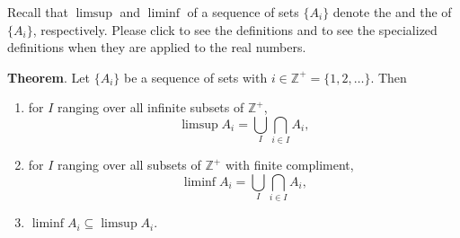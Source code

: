 \documentclass[12pt]{article}
\begin{document}
Recall that $\limsup$ and $\liminf$ of a sequence of sets $\lbrace A_i \rbrace$ denote the  and the  of $\lbrace A_i \rbrace$, respectively.  Please click  to see the definitions and  to see the specialized definitions when they are applied to the real numbers.

\textbf{Theorem}.  Let $\lbrace A_i \rbrace$ be a sequence of sets with $i\in\mathbb{Z}^{+}=\lbrace 1,2,\ldots \rbrace$.  Then
\begin{enumerate}
\item for $I$ ranging over all infinite subsets of $\mathbb{Z}^{+}$, $$\limsup A_i=\bigcup_{I}\bigcap_{i\in I}A_i,$$
\item for $I$ ranging over all subsets of $\mathbb{Z}^{+}$ with finite compliment, $$\liminf A_i=\bigcup_{I}\bigcap_{i\in I}A_i,$$
\item $\liminf A_i\subseteq\limsup A_i$.
\end{enumerate}
\end{document}
